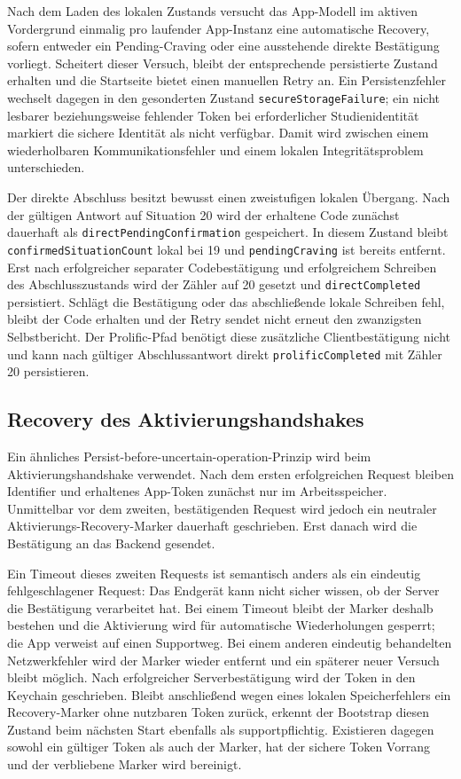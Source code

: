 \begin{neu}
Nach dem Laden des lokalen Zustands versucht das App-Modell im aktiven Vordergrund einmalig pro laufender App-Instanz eine automatische Recovery, sofern entweder ein Pending-Craving oder eine ausstehende direkte Bestätigung vorliegt. Scheitert dieser Versuch, bleibt der entsprechende persistierte Zustand erhalten und die Startseite bietet einen manuellen Retry an. Ein Persistenzfehler wechselt dagegen in den gesonderten Zustand \texttt{secureStorageFailure}; ein nicht lesbarer beziehungsweise fehlender Token bei erforderlicher Studienidentität markiert die sichere Identität als nicht verfügbar. Damit wird zwischen einem wiederholbaren Kommunikationsfehler und einem lokalen Integritätsproblem unterschieden.

Der direkte Abschluss besitzt bewusst einen zweistufigen lokalen Übergang. Nach der gültigen Antwort auf Situation 20 wird der erhaltene Code zunächst dauerhaft als \texttt{directPendingConfirmation} gespeichert. In diesem Zustand bleibt \texttt{confirmedSituationCount} lokal bei 19 und \texttt{pendingCraving} ist bereits entfernt. Erst nach erfolgreicher separater Codebestätigung und erfolgreichem Schreiben des Abschlusszustands wird der Zähler auf 20 gesetzt und \texttt{directCompleted} persistiert. Schlägt die Bestätigung oder das abschließende lokale Schreiben fehl, bleibt der Code erhalten und der Retry sendet nicht erneut den zwanzigsten Selbstbericht. Der Prolific-Pfad benötigt diese zusätzliche Clientbestätigung nicht und kann nach gültiger Abschlussantwort direkt \texttt{prolificCompleted} mit Zähler 20 persistieren.

\subsection{Recovery des Aktivierungshandshakes}

Ein ähnliches Persist-before-uncertain-operation-Prinzip wird beim Aktivierungshandshake verwendet. Nach dem ersten erfolgreichen Request bleiben Identifier und erhaltenes App-Token zunächst nur im Arbeitsspeicher. Unmittelbar vor dem zweiten, bestätigenden Request wird jedoch ein neutraler Aktivierungs-Recovery-Marker dauerhaft geschrieben. Erst danach wird die Bestätigung an das Backend gesendet.

Ein Timeout dieses zweiten Requests ist semantisch anders als ein eindeutig fehlgeschlagener Request: Das Endgerät kann nicht sicher wissen, ob der Server die Bestätigung verarbeitet hat. Bei einem Timeout bleibt der Marker deshalb bestehen und die Aktivierung wird für automatische Wiederholungen gesperrt; die App verweist auf einen Supportweg. Bei einem anderen eindeutig behandelten Netzwerkfehler wird der Marker wieder entfernt und ein späterer neuer Versuch bleibt möglich. Nach erfolgreicher Serverbestätigung wird der Token in den Keychain geschrieben. Bleibt anschließend wegen eines lokalen Speicherfehlers ein Recovery-Marker ohne nutzbaren Token zurück, erkennt der Bootstrap diesen Zustand beim nächsten Start ebenfalls als supportpflichtig. Existieren dagegen sowohl ein gültiger Token als auch der Marker, hat der sichere Token Vorrang und der verbliebene Marker wird bereinigt.


\end{neu}

